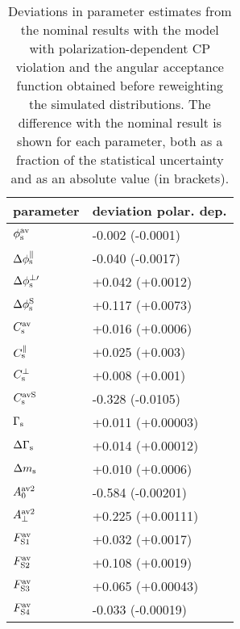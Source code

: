 \begin{table}[htbp]
  \centering
  \caption{Deviations in parameter estimates from the nominal results with the model with polarization-dependent CP violation and the
           angular acceptance function obtained before reweighting the simulated distributions.
           The difference with the nominal result is shown for each parameter, both as a fraction of the statistical uncertainty and as an
           absolute value (in brackets).}
  \label{tab:syst_angAcc_sim_polarDep}
  \begin{tabular}{lll}
    \hline
    parameter            &  \multicolumn{2}{l}{deviation polar. dep.}  \\
    \hline
    $\phisav$            &  -0.002 (-0.0001)                           \\
    $\Delphispara$       &  -0.040 (-0.0017)                           \\
    $\Delphisperpp$      &  +0.042 (+0.0012)                           \\
    $\DelphisS$          &  +0.117 (+0.0073)                           \\
    \hline
    $\Csav$              &  +0.016 (+0.0006)                           \\
    $\DelCspara$         &  +0.025 (+0.003)                            \\
    $\DelCsperp$         &  +0.008 (+0.001)                            \\
    $\CsavS$             &  -0.328 (-0.0105)                           \\
    \hline
    $\Gs$                &  +0.011 (+0.00003)                          \\
    $\DGs$               &  +0.014 (+0.00012)                          \\
    $\Dms$               &  +0.010 (+0.0006)                           \\
    \hline
    $\magzeroAvSq$       &  -0.584 (-0.00201)                          \\
    $\magperpAvSq$       &  +0.225 (+0.00111)                          \\
    $\FSAv[1]$           &  +0.032 (+0.0017)                           \\
    $\FSAv[2]$           &  +0.108 (+0.0019)                           \\
    $\FSAv[3]$           &  +0.065 (+0.00043)                          \\
    $\FSAv[4]$           &  -0.033 (-0.00019)                          \\

\end{tabular}
\end{table}
